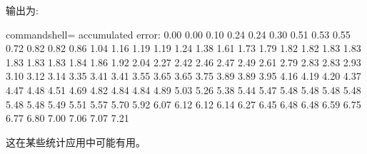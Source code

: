 输出为:

\begin{tcblisting}{commandshell={}}
accumulated error:
0.00 0.00 0.10 0.24 0.24 0.30 0.51 0.53 0.55 0.72
0.82 0.82 0.86 1.04 1.16 1.19 1.19 1.24 1.38 1.61
1.73 1.79 1.82 1.82 1.83 1.83 1.83 1.83 1.83 1.84
1.86 1.92 2.04 2.27 2.42 2.46 2.47 2.49 2.61 2.79
2.83 2.83 2.93 3.10 3.12 3.14 3.35 3.41 3.41 3.55
3.65 3.65 3.75 3.89 3.89 3.95 4.16 4.19 4.20 4.37
4.47 4.48 4.51 4.69 4.82 4.84 4.84 4.89 5.03 5.26
5.38 5.44 5.47 5.48 5.48 5.48 5.48 5.48 5.48 5.49
5.51 5.57 5.70 5.92 6.07 6.12 6.12 6.14 6.27 6.45
6.48 6.48 6.59 6.75 6.77 6.80 7.00 7.06 7.07 7.21
\end{tcblisting}

这在某些统计应用中可能有用。









